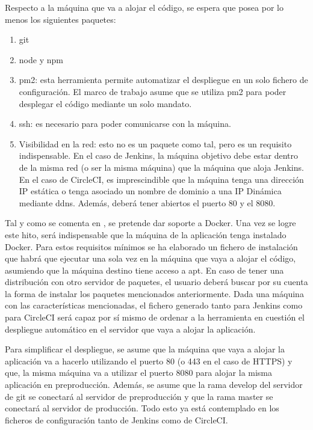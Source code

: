 Respecto a la máquina que va a alojar el código, se espera que posea por lo menos los siguientes paquetes:
\begin{enumerate}
  \item git
  \item node y npm
  \item pm2: esta herramienta permite automatizar el despliegue en un solo fichero de configuración. El marco de trabajo asume que se utiliza pm2 para poder desplegar el código mediante un solo mandato.
  \item ssh: es necesario para poder comunicarse con la máquina.
  \item Visibilidad en la red: esto no es un paquete como tal, pero es un requisito indispensable. En el caso de Jenkins, la máquina objetivo debe estar dentro de la misma red (o ser la misma máquina) que la máquina que aloja Jenkins. En el caso de CircleCI, es imprescindible que la máquina tenga una dirección IP estática o tenga asociado un nombre de dominio a una IP Dinámica mediante \gls{ddns}. Además, deberá tener abiertos el puerto 80 y el 8080.
\end{enumerate}
Tal y como se comenta en , se pretende dar soporte a Docker. Una vez se logre este hito, será indispensable que la máquina de la aplicación tenga instalado Docker. Para estos requisitos mínimos se ha elaborado un fichero de instalación que habrá que ejecutar una sola vez en la máquina que vaya a alojar el código, asumiendo que la máquina destino tiene acceso a apt. En caso de tener una distribución con otro servidor de paquetes, el usuario deberá buscar por su cuenta la forma de instalar los paquetes mencionados anteriormente. Dada una máquina con las características mencionadas, el fichero generado tanto para Jenkins como para CircleCI será capaz por sí mismo de ordenar a la herramienta en cuestión el despliegue automático en el servidor que vaya a alojar la aplicación.

Para simplificar el despliegue, se asume que la máquina que vaya a alojar la aplicación va a hacerlo utilizando el puerto 80 (o 443 en el caso de HTTPS) y que, la misma máquina va a utilizar el puerto 8080 para alojar la misma aplicación en preproducción. Además, se asume que la rama develop del servidor de git se conectará al servidor de preproducción y que la rama master se conectará al servidor de producción. Todo esto ya está contemplado en los ficheros de configuración tanto de Jenkins como de CircleCI.

